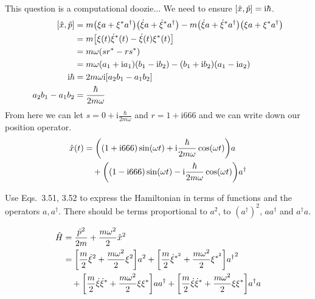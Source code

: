 \documentclass[boxes,pages]{homework}
\makeatletter
\newcommand{\iu}{\mathrm{i}}
\numberwithin{@problem}{section}
\makeatother
\begin{document}
\begin{solution}
	This question is a computational doozie... We need to ensure $\comm{\hat{x}}{\hat{p}} = \iu\hbar$.
	\begin{align*}
		\comm{\hat{x}}{\hat{p}} & = m\qty(\xi a + \xi^*a^\dagger)\qty(\dot{\xi}a + \dot{\xi}^*a^\dagger) - m\qty(\dot{\xi}a + \dot{\xi}^*a^\dagger)\qty(\xi a + \xi^*a^\dagger) \\
		                        & = m\qty[\xi(t)\dot{\xi}^*(t) - \dot{\xi}(t)\xi^*(t)]                                                                                          \\
		                        & = m\omega\qty(sr^* -rs^*)                                                                                                                     \\
		                        & = m\omega\qty(a_1 + \iu a_1)\qty(b_1 - \iu b_2) - (b_1 + \iu b_2)\qty(a_1 - \iu a_2)                                                          \\
		\iu\hbar                & = 2m\omega\iu\qty[a_2b_1 - a_1b_2]                                                                                                            \\
		a_2b_1 - a_1b_2         & = \frac{\hbar}{2m\omega}
	\end{align*}
	From here we can let $s = 0 + \iu \frac{\hbar}{2m\omega}$ and $r = 1 + \iu 666$ and we can write down our position operator.
	\begin{align*}
		\hat{x}(t) & = \qty((1 + \iu 666)\sin(\omega t) + \iu\frac{\hbar}{2m\omega}\cos(\omega t))a               \\
		           & \quad + \qty((1 - \iu 666)\sin(\omega t) - \iu\frac{\hbar}{2m\omega}\cos(\omega t))a^\dagger
	\end{align*}
\end{solution}

\begin{problem}
Use Eqs.\ 3.51, 3.52 to express the Hamiltonian in terms of functions and the operators $a, a^\dagger$. There should be terms proportional to $a^2$, to $(a^\dagger)^2$, $aa^\dagger$ and $a^\dagger a$.
\end{problem}

\begin{solution}
	\begin{align*}
		\hat{H} & = \frac{\hat{p}^2}{2m} + \frac{m\omega^2}{2}\hat{x}^2                                                                                                                  \\
		        & = \qty[\frac{m}{2}\dot{\xi}^2 + \frac{m\omega^2}{2}\xi^2]a^2 + \qty[\frac{m}{2}\dot{\xi}^{*^2} + \frac{m\omega^2}{2}\xi^{*^2}]{a^\dagger}^2                            \\
		        & \quad + \qty[\frac{m}{2}\dot{\xi}\dot{\xi}^* + \frac{m\omega^2}{2}\xi\xi^*]aa^\dagger + \qty[\frac{m}{2}\dot{\xi}\dot{\xi}^* + \frac{m\omega^2}{2}\xi\xi^*]a^\dagger a
	\end{align*}
\end{solution}
\end{document}
